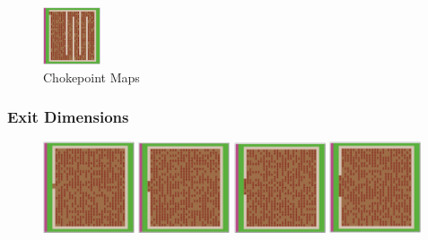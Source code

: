 \documentclass[12pt,letterpaper]{article}
\begin{document}
\begin{figure}[ht]
\begin{minipage}[b]{\linewidth}
    \includegraphics[width=0.15\textwidth]{./figures/chokepoint_3_d.png}
  \end{minipage}
  \caption{Chokepoint Maps}
\end{figure}

\subsubsection{Exit Dimensions}

\begin{figure}[ht]
  \centering
  \begin{minipage}[b]{.75\linewidth}
    \includegraphics[width=0.24\textwidth]{./figures/exit_dims_2_a.png}
    \includegraphics[width=0.24\textwidth]{./figures/exit_dims_4_a.png}
    \includegraphics[width=0.24\textwidth]{./figures/exit_dims_6_a.png}
    \includegraphics[width=0.24\textwidth]{./figures/exit_dims_8_a.png}
  \end{minipage}

\end{figure}
\end{document}
